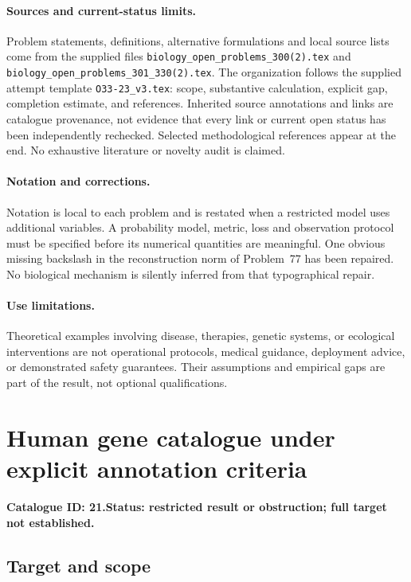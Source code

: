 \documentclass[11pt]{article}
\begin{document}
\paragraph{Sources and current-status limits.}
Problem statements, definitions, alternative formulations and local source lists
come from the supplied files
\texttt{biology\_open\_problems\_300(2).tex} and
\texttt{biology\_open\_problems\_301\_330(2).tex}.
The organization follows the supplied attempt template
\texttt{O33-23\_v3.tex}: scope, substantive calculation, explicit gap,
completion estimate, and references. Inherited source annotations and links are
catalogue provenance, not evidence that every link or current open status has
been independently rechecked. Selected methodological references appear at the
end. No exhaustive literature or novelty audit is claimed.

\paragraph{Notation and corrections.}
Notation is local to each problem and is restated when a restricted model uses
additional variables. A probability model, metric, loss and observation protocol
must be specified before its numerical quantities are meaningful. One obvious
missing backslash in the reconstruction norm of Problem~77 has been repaired.
No biological mechanism is silently inferred from that typographical repair.

\paragraph{Use limitations.}
Theoretical examples involving disease, therapies, genetic systems, or ecological
interventions are not operational protocols, medical guidance, deployment advice,
or demonstrated safety guarantees. Their assumptions and empirical gaps are part
of the result, not optional qualifications.

\setcounter{section}{20}
\section{Human gene catalogue under explicit annotation criteria}
\label{prob:021}
\noindent\textbf{Catalogue ID: 21.}\quad \textbf{Status: restricted result or obstruction; full target not established.}
\subsection{Target and scope}
\end{document}
